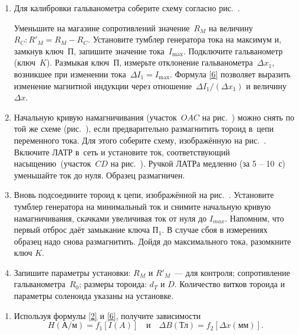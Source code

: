 \begin{lab:task}
\begin{enumerate}
	
	\item Для калибровки гальванометра соберите схему согласно рис.~. 
	
	Уменьшите на магазине сопротивлений значение~$R_M$ на
	величину~$R_C: R'_M=R_M-R_C$. Установите тумблер генератора тока на максимум и, замкнув ключ~$\text{П}$, запишите значение
	тока~$I_{\max}$. Подключите гальванометр (ключ~$K$). Размыкая ключ~$\text{П}$, измерьте отклонение гальванометра~$\Delta x_1$,
	возникшее при изменении тока~$\Delta I_1=I_{\max}$. Формула \eqref{6} позволяет выразить изменение магнитной индукции через
	отношение~$\Delta I_1/(\Delta x_1)$ и величину~$\Delta x$.
	
	
	\item Начальную кривую намагничивания (участок~$OAC$ на рис.~) можно снять по той же схеме (рис.~), если предварительно
	размагнитить тороид в~цепи переменного тока. Для этого соберите схему, изображённую на рис.~. Включите ЛАТР в~сеть и
	установите ток, соответствующий насыщению~(участок~$CD$ на рис.~). Ручкой ЛАТРа медленно (за 5 -- 10~с) уменьшайте ток до
	нуля. Образец размагничен.
	
	\item Вновь подсоедините тороид к цепи, изображённой на рис.~. Установите тумблер генератора на минимальный ток и снимите  начальную кривую намагничивания,  скачками увеличивая ток от нуля до $I_{max}$. Напомним, что первый отброс даёт замыкание ключа $\text{П}_1$.  В случае сбоя в измерениях образец надо снова размагнитить. 
	Дойдя до максимального тока,  разомкните ключ $K$.

	\item Запишите параметры установки: $R_M$ и $R'_M$~--- для контроля; сопротивление гальванометра~$R_0$; размеры тороида:
	$d_T$ и $D$. Количество витков тороида и параметры соленоида указаны на установке.
	
	\end{enumerate}	
	
	
	\begin{enumerate}
	
		\item Используя формулы \eqref{2} и \eqref{6}, получите зависимости
		\begin{equation*}
			H(\text{А/м})=f_1[I(A)]\quad и\quad \Delta B(\text{Тл})=f_2[\Delta x(\text{мм})].
		\end{equation*}
		

\end{enumerate}
\end{lab:task}
